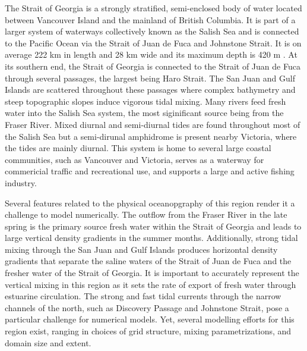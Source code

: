 \documentclass[pdftex,10pt]{article}
\begin{document}
The Strait of Georgia is a strongly stratified, semi-enclosed body of water located between Vancouver Island and the mainland of British Columbia. It is part of a larger system of waterways collectively known as the Salish Sea and is connected to the Pacific Ocean via the Strait of Juan de Fuca and Johnstone Strait. It is on average 222 km in length and 28 km wide and its maximum depth is 420 m \citep{thomson1981oceanography}. At its southern end, the Strait of Georgia is connected to the Strait of Juan de Fuca through several passages, the largest being Haro Strait. The San Juan and Gulf Islands are scattered throughout these passages where complex bathymetry and steep topographic slopes induce vigorous tidal mixing. Many rivers feed fresh water into the Salish Sea system, the most siginificant source being from the Fraser River. Mixed diurnal and semi-diurnal tides are found throughout most of the Salish Sea but a semi-dirunal amphidrome is present nearby Victoria, where the tides are mainly diurnal. This system is home to several large coastal communities, such as Vancouver and Victoria, serves as a waterway for commericial traffic and recreational use, and supports a large and active fishing industry.   

Several features related to the physical oceanopgraphy of this region render it a challenge to model numerically. The outflow from the Fraser River in the late spring is the primary source fresh water within the Strait of Georgia and leads to large vertical density gradients in the summer months. Additionally, strong tidal mixing through the San Juan and Gulf Islands produces horizontal density gradients that separate the saline waters of the Strait of Juan de Fuca and the fresher water of the Strait of Georgia. It is important to accurately represent the vertical mixing in this region as it sets the rate of export of fresh water through estuarine circulation. The strong and fast tidal currents through the narrow channels of the north, such as Discovery Passage and Johnstone Strait, pose a particular challenge for numerical models. Yet, several modelling efforts for this region exist, ranging in choices of grid structure, mixing parametrizations, and domain size and extent. 
\end{document}
